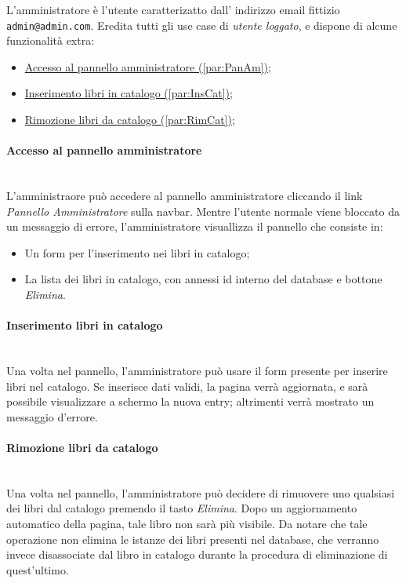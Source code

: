 L'amministratore è l'utente caratterizatto dall' indirizzo email fittizio \texttt{admin@admin.com}. Eredita tutti gli use case di \textit{utente loggato}, e dispone di alcune funzionalità extra:
\begin{itemize}
	\item \hyperref[par:PanAm]{Accesso al pannello amministratore (\ref{par:PanAm})};
	\item \hyperref[par:InsCat]{Inserimento libri in catalogo (\ref{par:InsCat})};
	\item \hyperref[par:RimCat]{Rimozione libri da catalogo (\ref{par:RimCat})};
\end{itemize}

\paragraph{Accesso al pannello amministratore}\mbox{}\\
\label{par:PanAm}
L'amministraore può accedere al pannello amministratore cliccando il link \textit{Pannello Amministratore} sulla navbar. Mentre l'utente normale viene bloccato da un messaggio di errore, l'amministratore visuallizza il pannello che consiste in:
\begin{itemize}
	\item Un form per l'inserimento nei libri in catalogo;
	\item La lista dei libri in catalogo, con annessi id interno del database e bottone \textit{Elimina}.
\end{itemize}

\paragraph{Inserimento libri in catalogo}\mbox{}\\
\label{par:InsCat}
Una volta nel pannello, l'amministratore può usare il form presente per inserire libri nel catalogo. Se inserisce dati validi, la pagina verrà aggiornata, e sarà possibile visualizzare a schermo la nuova entry; altrimenti verrà mostrato un messaggio d'errore.

\paragraph{Rimozione libri da catalogo}\mbox{}\\
\label{par:RimCat}
Una volta nel pannello, l'amministratore può decidere di rimuovere uno qualsiasi dei libri dal catalogo premendo il tasto \textit{Elimina}. Dopo un aggiornamento automatico della pagina, tale libro non sarà più visibile. Da notare che tale operazione non elimina le istanze dei libri presenti nel database, che verranno invece disassociate dal libro in catalogo durante la procedura di eliminazione di quest'ultimo.
